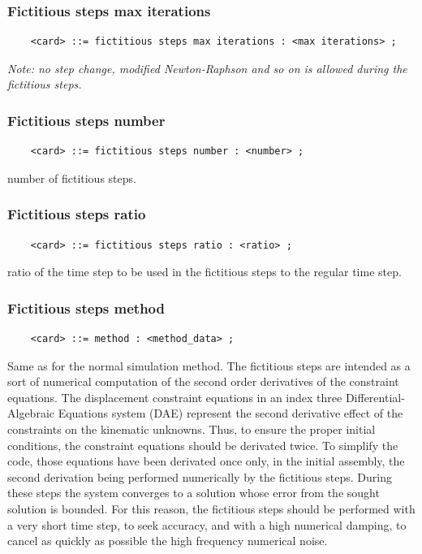 \documentclass[10pt,dvips]{report}
\begin{document}
\subsubsection{Fictitious steps max iterations}
\begin{verbatim}
    <card> ::= fictitious steps max iterations : <max iterations> ;
\end{verbatim}    
{\em
    Note: no step change, modified Newton-Raphson and so on is allowed
    during the fictitious steps.
}

\subsubsection{Fictitious steps number}
\begin{verbatim}
    <card> ::= fictitious steps number : <number> ;
\end{verbatim}
number of fictitious steps.

\subsubsection{Fictitious steps ratio}
\begin{verbatim}
    <card> ::= fictitious steps ratio : <ratio> ;
\end{verbatim}
ratio of the time step to be used in the fictitious steps to the regular
time step.

\subsubsection{Fictitious steps method}
\begin{verbatim}
    <card> ::= method : <method_data> ;
\end{verbatim}
Same as for the normal simulation method. The fictitious steps are
intended as a sort of numerical computation of the second order
derivatives of the constraint equations. The displacement constraint 
equations in an index three Differential-Algebraic Equations system
(DAE) represent the second derivative effect of the constraints on the
kinematic unknowns. Thus, to ensure the proper initial conditions, the
constraint equations should be derivated twice. To simplify the code,
those equations have been derivated once only, in the initial assembly,
the second derivation being performed numerically by the fictitious steps.
During these steps the system converges to a solution whose error from
the sought solution is bounded. For this reason, the fictitious steps
should be performed with a very short time step, to seek accuracy, and
with a high numerical damping, to cancel as quickly as possible the high
frequency numerical noise.
\end{document}
